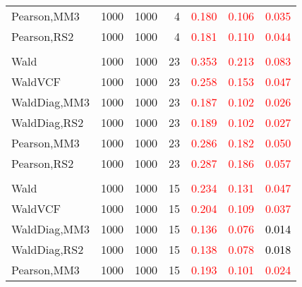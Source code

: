 \documentclass[
]{article}
\begin{document}
\begin{table}[H]
{\begin{tabular}[t]{lrrrrrr}
\hspace{1em}Pearson,MM3 & 1000 & 1000 & 4 & \textcolor{red}{0.180} & \textcolor{red}{0.106} & \textcolor{red}{0.035}\\
\hspace{1em}Pearson,RS2 & 1000 & 1000 & 4 & \textcolor{red}{0.181} & \textcolor{red}{0.110} & \textcolor{red}{0.044}\\
\addlinespace[0.3em]
\multicolumn{7}{l}{\textbf{1F 15V}}\\
\hspace{1em}Wald & 1000 & 1000 & 23 & \textcolor{red}{0.353} & \textcolor{red}{0.213} & \textcolor{red}{0.083}\\
\hspace{1em}WaldVCF & 1000 & 1000 & 23 & \textcolor{red}{0.258} & \textcolor{red}{0.153} & \textcolor{red}{0.047}\\
\hspace{1em}WaldDiag,MM3 & 1000 & 1000 & 23 & \textcolor{red}{0.187} & \textcolor{red}{0.102} & \textcolor{red}{0.026}\\
\hspace{1em}WaldDiag,RS2 & 1000 & 1000 & 23 & \textcolor{red}{0.189} & \textcolor{red}{0.102} & \textcolor{red}{0.027}\\
\hspace{1em}Pearson,MM3 & 1000 & 1000 & 23 & \textcolor{red}{0.286} & \textcolor{red}{0.182} & \textcolor{red}{0.050}\\
\hspace{1em}Pearson,RS2 & 1000 & 1000 & 23 & \textcolor{red}{0.287} & \textcolor{red}{0.186} & \textcolor{red}{0.057}\\
\addlinespace[0.3em]
\multicolumn{7}{l}{\textbf{2F 10V}}\\
\hspace{1em}Wald & 1000 & 1000 & 15 & \textcolor{red}{0.234} & \textcolor{red}{0.131} & \textcolor{red}{0.047}\\
\hspace{1em}WaldVCF & 1000 & 1000 & 15 & \textcolor{red}{0.204} & \textcolor{red}{0.109} & \textcolor{red}{0.037}\\
\hspace{1em}WaldDiag,MM3 & 1000 & 1000 & 15 & \textcolor{red}{0.136} & \textcolor{red}{0.076} & \textcolor{black}{0.014}\\
\hspace{1em}WaldDiag,RS2 & 1000 & 1000 & 15 & \textcolor{red}{0.138} & \textcolor{red}{0.078} & \textcolor{black}{0.018}\\
\hspace{1em}Pearson,MM3 & 1000 & 1000 & 15 & \textcolor{red}{0.193} & \textcolor{red}{0.101} & \textcolor{red}{0.024}\\

\end{tabular}}
\end{table}
\end{document}

